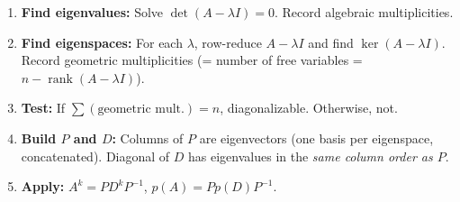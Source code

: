 \begin{examtip}[title={Exam Focus: complete diagonalizability workflow summary}]
\begin{enumerate}[leftmargin=*]
\item \textbf{Find eigenvalues:} Solve $\det(A-\lambda I)=0$. Record algebraic multiplicities.
\item \textbf{Find eigenspaces:} For each $\lambda$, row-reduce $A-\lambda I$ and find $\ker(A-\lambda I)$. Record geometric multiplicities (= number of free variables = $n - \operatorname{rank}(A-\lambda I)$).
\item \textbf{Test:} If $\sum(\text{geometric mult.})=n$, diagonalizable. Otherwise, not.
\item \textbf{Build $P$ and $D$:} Columns of $P$ are eigenvectors (one basis per eigenspace, concatenated). Diagonal of $D$ has eigenvalues in the \emph{same column order as $P$}.
\item \textbf{Apply:} $A^k = PD^kP^{-1}$, $p(A)=Pp(D)P^{-1}$.
\end{enumerate}
\end{examtip}

